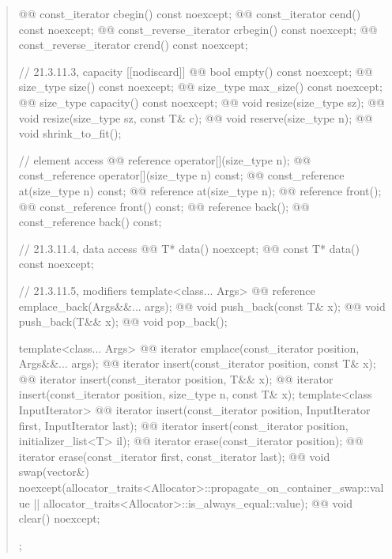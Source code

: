 \documentclass{wg21}
\begin{document}
\begin{quote}
\begin{codeblock}
{{    @@ const_iterator         cbegin() const noexcept;
    @@ const_iterator         cend() const noexcept;
    @@ const_reverse_iterator crbegin() const noexcept;
    @@ const_reverse_iterator crend() const noexcept;

    // 21.3.11.3, capacity
    [[nodiscard]] @@ bool empty() const noexcept;
    @@ size_type size() const noexcept;
    @@ size_type max_size() const noexcept;
    @@ size_type capacity() const noexcept;
    @@ void      resize(size_type sz);
    @@ void      resize(size_type sz, const T& c);
    @@ void      reserve(size_type n);
    @@ void      shrink_to_fit();

    // element access
    @@ reference       operator[](size_type n);
    @@ const_reference operator[](size_type n) const;
    @@ const_reference at(size_type n) const;
    @@ reference       at(size_type n);
    @@ reference       front();
    @@ const_reference front() const;
    @@ reference       back();
    @@ const_reference back() const;

    // 21.3.11.4, data access
    @@ T*       data() noexcept;
    @@ const T* data() const noexcept;

    // 21.3.11.5, modifiers
    template<class... Args> @@ reference emplace_back(Args&&... args);
    @@ void push_back(const T& x);
    @@ void push_back(T&& x);
    @@ void pop_back();

    template<class... Args> @@ iterator emplace(const_iterator position, Args&&... args);
    @@ iterator insert(const_iterator position, const T& x);
    @@ iterator insert(const_iterator position, T&& x);
    @@ iterator insert(const_iterator position, size_type n, const T& x);
    template<class InputIterator>
    @@ iterator insert(const_iterator position, InputIterator first, InputIterator last);
    @@ iterator insert(const_iterator position, initializer_list<T> il);
    @@ iterator erase(const_iterator position);
    @@ iterator erase(const_iterator first, const_iterator last);
    @@ void     swap(vector&)
      noexcept(allocator_traits<Allocator>::propagate_on_container_swap::value ||
               allocator_traits<Allocator>::is_always_equal::value);
    @@ void     clear() noexcept;
  };

}
\end{codeblock}
\end{quote}
\end{document}
